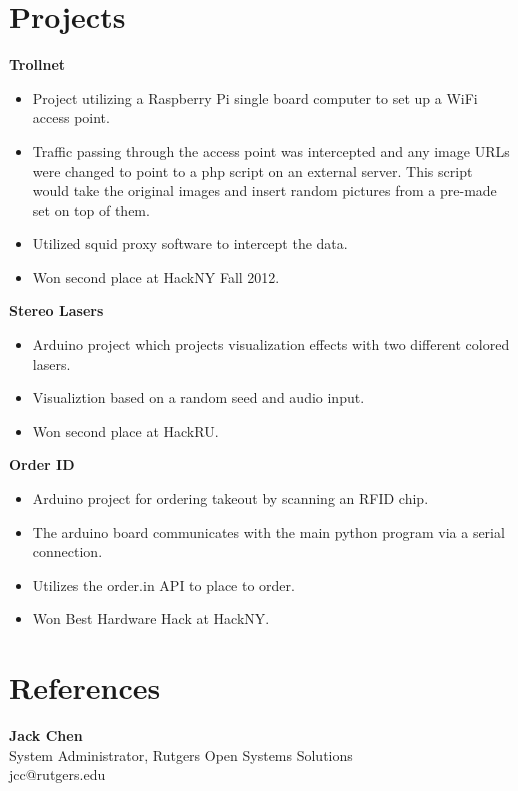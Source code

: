 \documentclass[margin]{res}
\begin{document}
\begin{resume}

\section{Projects}

	{\bf Trollnet}
	\begin{itemize} \itemsep -2pt
		\item Project utilizing a Raspberry Pi single board computer to set up a WiFi access point.
		\item Traffic passing through the access point was intercepted and any image URLs were changed to point to a php script on an external server. This script would take the original images and insert random pictures from a pre-made set on top of them.
		\item Utilized squid proxy software to intercept the data.
		\item Won second place at HackNY Fall 2012.
	\end{itemize}

	{\bf Stereo Lasers}
	\begin{itemize} \itemsep -2pt
		\item Arduino project which projects visualization effects with two different colored lasers.
		\item Visualiztion based on a random seed and audio input.
		\item Won second place at HackRU.
	\end{itemize}

	{\bf Order ID}
	\begin{itemize} \itemsep -2pt
		\item Arduino project for ordering takeout by scanning an RFID chip.
		\item The arduino board communicates with the main python program via a serial connection.
		\item Utilizes the order.in API to place to order.
		\item Won Best Hardware Hack at HackNY.
	\end{itemize}

\section{References}
{\bf Jack Chen}\\
System Administrator, Rutgers Open Systems Solutions\\
jcc@rutgers.edu

\end{resume}
\end{document}
